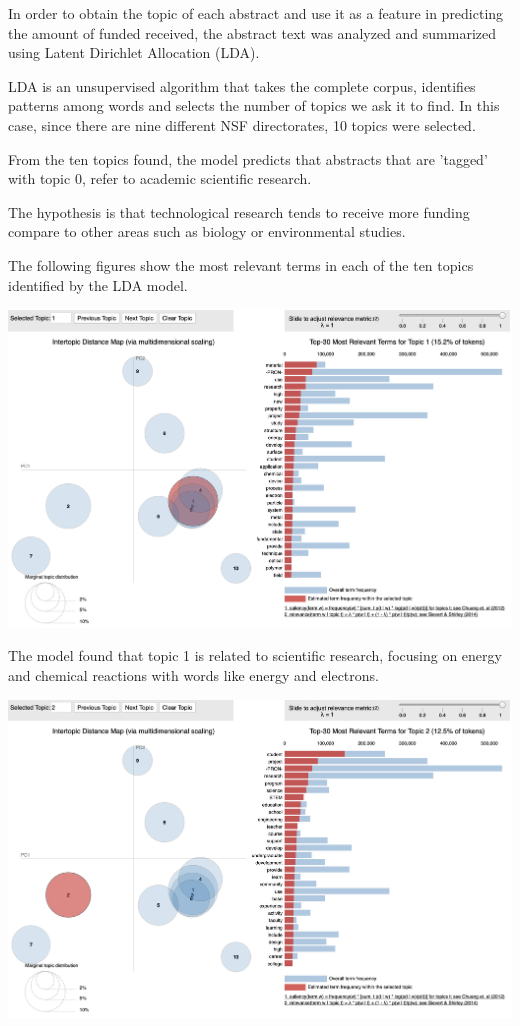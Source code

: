 \documentclass[11pt, oneside]{article}   	%
\begin{document}
In order to obtain the topic of each abstract and use it as a feature in predicting the amount of funded received, the abstract text was analyzed and summarized using Latent Dirichlet Allocation (LDA).
 
 LDA is an unsupervised algorithm that takes the complete corpus, identifies patterns among words and selects the number of topics we ask it to find. In this case, since there are nine different NSF directorates, 10 topics were selected.
 
From the ten topics found, the model predicts that abstracts that are 'tagged' with topic 0, refer to academic scientific research.
 
 The hypothesis is that technological research tends to receive more funding compare to other areas such as biology or environmental studies.
 
 The following figures show the most relevant terms in each of the ten topics identified by the LDA model.
 
 \includegraphics[width=\textwidth]{ldaVisualizationTopic1}
 
The model found that topic 1 is related to scientific research, focusing on energy and chemical reactions with words like energy and electrons.
 
 \includegraphics[width=\textwidth]{ldaVisualizationTopic2}
  
\end{document}
